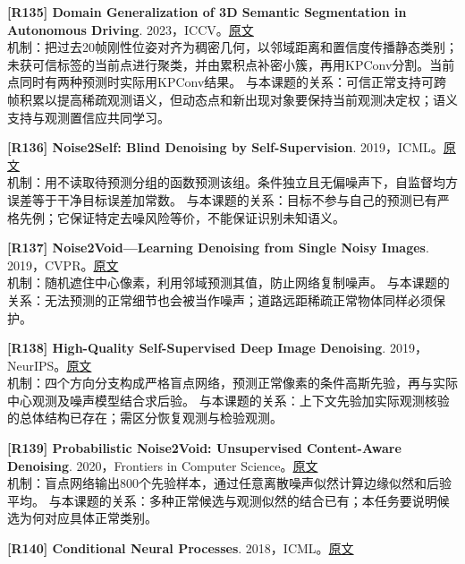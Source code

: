 \documentclass[11pt,a4paper]{article}
\begin{document}
\hypertarget{R135}{}\textbf{[R135] Domain Generalization of 3D Semantic Segmentation in Autonomous Driving}. 2023，ICCV。\href{https://openaccess.thecvf.com/content/ICCV2023/papers/Sanchez_Domain_Generalization_of_3D_Semantic_Segmentation_in_Autonomous_Driving_ICCV_2023_paper.pdf}{原文}\\
机制：把过去20帧刚性位姿对齐为稠密几何，以邻域距离和置信度传播静态类别；未获可信标签的当前点进行聚类，并由累积点补密小簇，再用KPConv分割。当前点同时有两种预测时实际用KPConv结果。 与本课题的关系：可信正常支持可跨帧积累以提高稀疏观测语义，但动态点和新出现对象要保持当前观测决定权；语义支持与观测置信应共同学习。\par\medskip
\hypertarget{R136}{}\textbf{[R136] Noise2Self: Blind Denoising by Self-Supervision}. 2019，ICML。\href{https://proceedings.mlr.press/v97/batson19a/batson19a.pdf}{原文}\\
机制：用不读取待预测分组的函数预测该组。条件独立且无偏噪声下，自监督均方误差等于干净目标误差加常数。 与本课题的关系：目标不参与自己的预测已有严格先例；它保证特定去噪风险等价，不能保证识别未知语义。\par\medskip
\hypertarget{R137}{}\textbf{[R137] Noise2Void—Learning Denoising from Single Noisy Images}. 2019，CVPR。\href{https://arxiv.org/pdf/1811.10980v2}{原文}\\
机制：随机遮住中心像素，利用邻域预测其值，防止网络复制噪声。 与本课题的关系：无法预测的正常细节也会被当作噪声；道路远距稀疏正常物体同样必须保护。\par\medskip
\hypertarget{R138}{}\textbf{[R138] High-Quality Self-Supervised Deep Image Denoising}. 2019，NeurIPS。\href{https://papers.neurips.cc/paper/8920-high-quality-self-supervised-deep-image-denoising.pdf}{原文}\\
机制：四个方向分支构成严格盲点网络，预测正常像素的条件高斯先验，再与实际中心观测及噪声模型结合求后验。 与本课题的关系：上下文先验加实际观测核验的总体结构已存在；需区分恢复观测与检验观测。\par\medskip
\hypertarget{R139}{}\textbf{[R139] Probabilistic Noise2Void: Unsupervised Content-Aware Denoising}. 2020，Frontiers in Computer Science。\href{https://arxiv.org/pdf/1906.00651}{原文}\\
机制：盲点网络输出800个先验样本，通过任意离散噪声似然计算边缘似然和后验平均。 与本课题的关系：多种正常候选与观测似然的结合已有；本任务要说明候选为何对应具体正常类别。\par\medskip
\hypertarget{R140}{}\textbf{[R140] Conditional Neural Processes}. 2018，ICML。\href{https://proceedings.mlr.press/v80/garnelo18a/garnelo18a.pdf}{原文}\\
\end{document}
